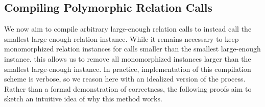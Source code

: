\documentclass{report}
\theoremstyle{definition}
\begin{document}
\subsection{Compiling Polymorphic Relation Calls}

We now aim to compile arbitrary large-enough relation calls to instead call the smallest large-enough relation instance.
While it remains necessary to keep monomorphized relation instances for calls smaller than the smallest large-enough instance.
this allows us to remove all monomorphized instances larger than the smallest large-enough instance.
In practice, implementation of this compilation scheme is verbose, so we reason here with an idealized version of the process.
Rather than a formal demonstration of correctness, the following proofs aim to sketch an intuitive idea of why this method works.
\end{document}
